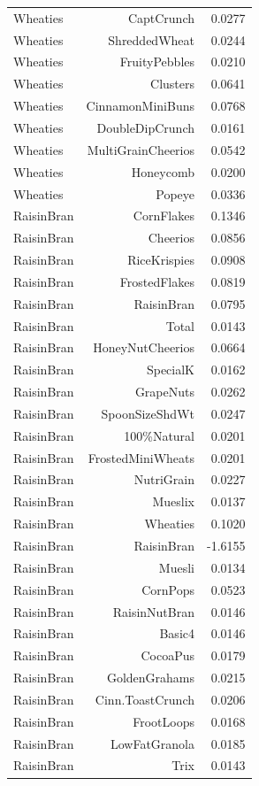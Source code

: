 \begin{longtable}{@{}lrr@{}}
Wheaties & CaptCrunch & 0.0277 \\
Wheaties & ShreddedWheat & 0.0244 \\
Wheaties & FruityPebbles & 0.0210 \\
Wheaties & Clusters & 0.0641 \\
Wheaties & CinnamonMiniBuns & 0.0768 \\
Wheaties & DoubleDipCrunch & 0.0161 \\
Wheaties & MultiGrainCheerios & 0.0542 \\
Wheaties & Honeycomb & 0.0200 \\
Wheaties & Popeye & 0.0336 \\
RaisinBran & CornFlakes & 0.1346 \\
RaisinBran & Cheerios & 0.0856 \\
RaisinBran & RiceKrispies & 0.0908 \\
RaisinBran & FrostedFlakes & 0.0819 \\
RaisinBran & RaisinBran & 0.0795 \\
RaisinBran & Total & 0.0143 \\
RaisinBran & HoneyNutCheerios & 0.0664 \\
RaisinBran & SpecialK & 0.0162 \\
RaisinBran & GrapeNuts & 0.0262 \\
RaisinBran & SpoonSizeShdWt & 0.0247 \\
RaisinBran & 100\%Natural & 0.0201 \\
RaisinBran & FrostedMiniWheats & 0.0201 \\
RaisinBran & NutriGrain & 0.0227 \\
RaisinBran & Mueslix & 0.0137 \\
RaisinBran & Wheaties & 0.1020 \\
RaisinBran & RaisinBran & -1.6155 \\
RaisinBran & Muesli & 0.0134 \\
RaisinBran & CornPops & 0.0523 \\
RaisinBran & RaisinNutBran & 0.0146 \\
RaisinBran & Basic4 & 0.0146 \\
RaisinBran & CocoaPus & 0.0179 \\
RaisinBran & GoldenGrahams & 0.0215 \\
RaisinBran & Cinn.ToastCrunch & 0.0206 \\
RaisinBran & FrootLoops & 0.0168 \\
RaisinBran & LowFatGranola & 0.0185 \\
RaisinBran & Trix & 0.0143 \\

\end{longtable}
